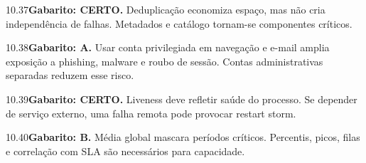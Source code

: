 \begin{solucao}{10.37}\textbf{Gabarito: CERTO.} Deduplicação economiza espaço, mas não cria independência de falhas. Metadados e catálogo tornam-se componentes críticos.\end{solucao}
\begin{solucao}{10.38}\textbf{Gabarito: A.} Usar conta privilegiada em navegação e e-mail amplia exposição a phishing, malware e roubo de sessão. Contas administrativas separadas reduzem esse risco.\end{solucao}
\begin{solucao}{10.39}\textbf{Gabarito: CERTO.} Liveness deve refletir saúde do processo. Se depender de serviço externo, uma falha remota pode provocar restart storm.\end{solucao}
\begin{solucao}{10.40}\textbf{Gabarito: B.} Média global mascara períodos críticos. Percentis, picos, filas e correlação com SLA são necessários para capacidade.\end{solucao}

